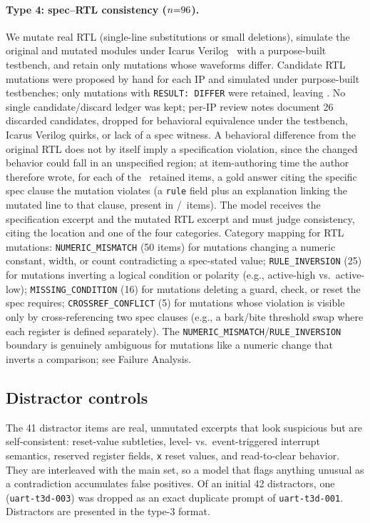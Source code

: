 \documentclass[11pt]{article}
\begin{document}
\paragraph{Type 4: spec--RTL consistency ($n{=}96$).} We mutate real RTL (single-line substitutions or small deletions), simulate the original and mutated modules under Icarus Verilog~\cite{iverilog} with a purpose-built testbench, and retain only mutations whose waveforms differ. Candidate RTL mutations were proposed by hand for each IP and simulated under purpose-built testbenches; only mutations with \texttt{RESULT: DIFFER} were retained, leaving \NTfour. No single candidate/discard ledger was kept; per-IP review notes document 26 discarded candidates, dropped for behavioral equivalence under the testbench, Icarus Verilog quirks, or lack of a spec witness. A behavioral difference from the original RTL does not by itself imply a specification violation, since the changed behavior could fall in an unspecified region; at item-authoring time the author therefore wrote, for each of the \NTfour\ retained items, a gold answer citing the specific spec clause the mutation violates (a \texttt{rule} field plus an explanation linking the mutated line to that clause, present in \NTfour/\NTfour\ items). The model receives the specification excerpt and the mutated RTL excerpt and must judge consistency, citing the location and one of the four categories. Category mapping for RTL mutations: \texttt{NUMERIC\_MISMATCH} (50 items) for mutations changing a numeric constant, width, or count contradicting a spec-stated value; \texttt{RULE\_INVERSION} (25) for mutations inverting a logical condition or polarity (e.g., active-high vs.\ active-low); \texttt{MISSING\_CONDITION} (16) for mutations deleting a guard, check, or reset the spec requires; \texttt{CROSSREF\_CONFLICT} (5) for mutations whose violation is visible only by cross-referencing two spec clauses (e.g., a bark/bite threshold swap where each register is defined separately). The \texttt{NUMERIC\_MISMATCH}/\texttt{RULE\_INVERSION} boundary is genuinely ambiguous for mutations like a numeric change that inverts a comparison; see Failure Analysis.

\subsection{Distractor controls}
The 41 distractor items are real, unmutated excerpts that look suspicious but are self-consistent: reset-value subtleties, level- vs.\ event-triggered interrupt semantics, reserved register fields, \texttt{x} reset values, and read-to-clear behavior. They are interleaved with the main set, so a model that flags anything unusual as a contradiction accumulates false positives. Of an initial 42 distractors, one (\texttt{uart-t3d-003}) was dropped as an exact duplicate prompt of \texttt{uart-t3d-001}. Distractors are presented in the type-3 format.
\end{document}
